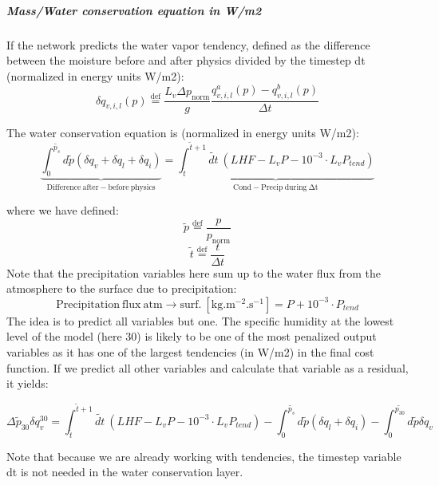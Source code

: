 \documentclass[11pt]{article}
\begin{document}
\hypertarget{masswater-conservation-equation-in-wm2}{%
\subparagraph{Mass/Water conservation equation in
W/m2}\label{masswater-conservation-equation-in-wm2}}

If the network predicts the water vapor tendency, defined as the
difference between the moisture before and after physics divided by the
timestep dt (normalized in energy units W/m2):
\[\delta q_{v,i,l}\left(p\right)\overset{\mathrm{def}}{=}\frac{L_{v}\Delta p_{\mathrm{norm}}}{g}\frac{q_{v,i,l}^{a}\left(p\right)-q_{v,i,l}^{b}\left(p\right)}{\Delta t}\]

The water conservation equation is (normalized in energy units W/m2):
\[\underbrace{\int_{0}^{\widetilde{p_{s}}}d\widetilde{p}\left(\delta q_{v}+\delta q_{l}+\delta q_{i}\right)}_{\mathrm{Difference\ after-before\ physics}}=\underbrace{\int_{\widetilde{t}}^{\widetilde{t}+1} \widetilde{dt}\ \left(LHF-L_{v}P-10^{-3}\cdot L_{v} P_{tend}\right)}_{\mathrm{Cond-Precip\ during\ \Delta t}}
\]

where we have defined: \[
\widetilde{p}\overset{\mathrm{def}}{=}\frac{p}{p_{\mathrm{norm}}}
\] \[
\widetilde{t}\overset{\mathrm{def}}{=}\frac{t}{\Delta t}
\] Note that the precipitation variables here sum up to the water flux
from the atmosphere to the surface due to precipitation: \[
\mathrm{Precipitation\ flux\ atm\rightarrow surf.\ \left[kg.m^{-2}.s^{-1}\right]}=P+10^{-3}\cdot P_{tend}
\] The idea is to predict all variables but one. The specific humidity
at the lowest level of the model (here 30) is likely to be one of the
most penalized output variables as it has one of the largest tendencies
(in W/m2) in the final cost function. If we predict all other variables
and calculate that variable as a residual, it yields:

\[\Delta \widetilde{p}_{30} \delta q_{v}^{30}=\int_{\widetilde{t}}^{\widetilde{t}+1} \widetilde{dt}\ \left(LHF-L_{v}P-10^{-3}\cdot L_{v} P_{tend}\right)-\int_{0}^{\widetilde{p_{s}}}d\widetilde{p}\left(\delta q_{l}+\delta q_{i}\right)-\int_{0}^{\widetilde{p_{30}}}d\widetilde{p}\delta q_{v}
\]

Note that because we are already working with tendencies, the timestep
variable dt is not needed in the water conservation layer.
\end{document}
